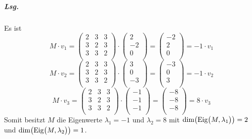\documentclass{scrreprt}
\begin{document}
\begin{enumerate}[(a)]
\begin{itemize}
    \subparagraph{Lsg.} Es ist
    \[
      M \cdot v_1 = \begin{pmatrix}
        2 & 3 & 3 \\
        3 & 2 & 3 \\
        3 & 3 & 2 \\
      \end{pmatrix} \cdot \begin{pmatrix}
        2  \\
        -2 \\
        0  \\
      \end{pmatrix} = \begin{pmatrix}
        -2  \\
        2 \\
        0  \\
      \end{pmatrix} = -1 \cdot v_1
    \]
    \[
      M \cdot v_2 = \begin{pmatrix}
        2 & 3 & 3 \\
        3 & 2 & 3 \\
        3 & 3 & 2 \\
      \end{pmatrix} \cdot \begin{pmatrix}
        3  \\
        0  \\
        -3 \\
      \end{pmatrix} = \begin{pmatrix}
        -3  \\
        0 \\
        3  \\
      \end{pmatrix} = -1 \cdot v_2
    \]
    \[
      M \cdot v_3 = \begin{pmatrix}
        2 & 3 & 3 \\
        3 & 2 & 3 \\
        3 & 3 & 2 \\
      \end{pmatrix} \cdot \begin{pmatrix}
        -1 \\
        -1 \\
        -1 \\
      \end{pmatrix} = \begin{pmatrix}
        -8  \\
        -8 \\
        -8  \\
      \end{pmatrix} = 8 \cdot v_3
    \]
    Somit besitzt $M$ die Eigenwerte $\lambda_1 = -1$ und $\lambda_2 = 8$ mit
    $\text{dim}\qty(\text{Eig}\qty\big(M, \lambda_1)) = 2$ und
    $\text{dim}\qty(\text{Eig}\qty\big(M, \lambda_2)) = 1$.


\end{itemize}
\end{enumerate}
\end{document}
